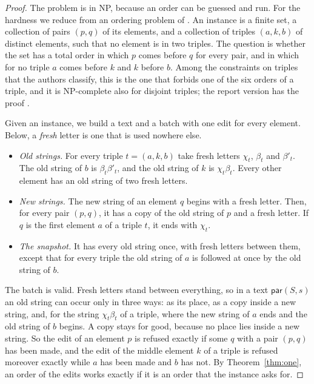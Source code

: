 \documentclass[acmsmall,nonacm,screen]{acmart}
\newcommand{\kw}[1]{\mathsf{#1}}
\newcommand{\Par}{\kw{par}}
\begin{document}
\begin{proof}
The problem is in NP, because an order can be guessed and run. For the hardness we reduce from
an ordering problem of \citet{Guttmann2006}. An instance is a finite set, a collection of
pairs $(p, q)$ of its elements, and a collection of triples $(a, k, b)$ of distinct elements,
such that no element is in two triples. The question is whether the set has a total order in
which $p$ comes before $q$ for every pair, and in which for no triple $a$ comes before $k$
and $k$ before $b$. Among the constraints on triples that the authors classify, this is the
one that forbids one of the six orders of a triple, and it is NP-complete also for disjoint
triples; the report version has the proof \citep{Guttmann2005}.

Given an instance, we build a text and a batch with one edit for every element. Below, a
\emph{fresh} letter is one that is used nowhere else.
\begin{itemize}
\item \emph{Old strings.} For every triple $t = (a, k, b)$ take fresh letters $\chi_t$,
  $\beta_t$ and $\beta'_t$. The old string of $b$ is $\beta_t\beta'_t$, and the old string of
  $k$ is $\chi_t\beta_t$. Every other element has an old string of two fresh letters.
\item \emph{New strings.} The new string of an element $q$ begins with a fresh letter. Then,
  for every pair $(p, q)$, it has a copy of the old string of $p$ and a fresh letter. If $q$
  is the first element $a$ of a triple $t$, it ends with $\chi_t$.
\item \emph{The snapshot.} It has every old string once, with fresh letters between them,
  except that for every triple the old string of $a$ is followed at once by the old string of
  $b$.
\end{itemize}
The batch is valid. Fresh letters stand between everything, so in a text $\Par(S, s)$ an old
string can occur only in three ways: as its place, as a copy inside a new string, and, for
the string $\chi_t\beta_t$ of a triple, where the new string of $a$ ends and the old string
of $b$ begins. A copy stays for good, because no place lies inside a new string. So the edit
of an element $p$ is refused exactly if some $q$ with a pair $(p, q)$ has been made, and the
edit of the middle element $k$ of a triple is refused moreover exactly while $a$ has been
made and $b$ has not. By Theorem~\ref{thm:one}, an order of the edits works exactly if it is
an order that the instance asks for.
\end{proof}
\end{document}

